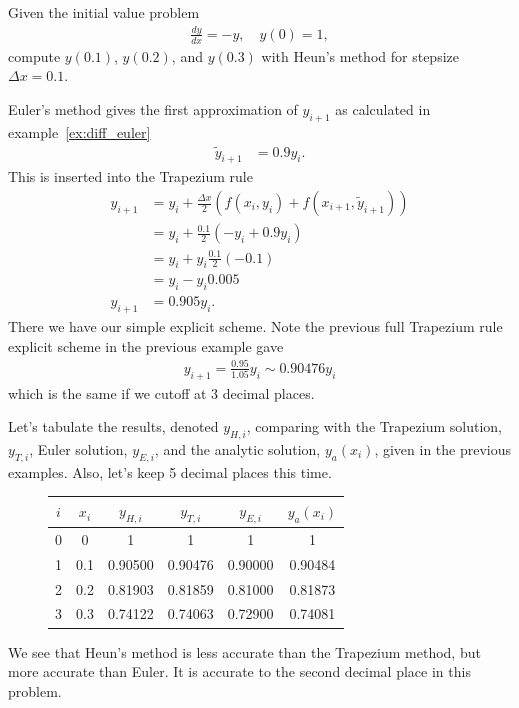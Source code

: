 \exemple{\upline}
{
Given the initial value problem
\begin{align*}
\frac{dy}{dx} = -y, \quad y(0)=1,
\end{align*}
compute $y(0.1)$, $y(0.2)$, and $y(0.3)$ with Heun's method for stepsize $\Delta x=0.1$.

\noindent Euler's method gives the first approximation of $y_{i+1}$ as calculated in example~\ref{ex:diff_euler}
\begin{align*}
\tilde{y}_{i+1} &= 0.9 y_i.
\end{align*}
This is inserted into the Trapezium rule
\begin{align*}
y_{i+1} &= y_i + \frac{\Delta x}{2} \left(f(x_i,y_i) + f(x_{i+1},\tilde{y}_{i+1}) \right) \\
%
&= y_i + \frac{0.1}{2} \left(-y_i + 0.9 y_i \right) \\
%
&= y_i + y_i  \frac{0.1}{2} \left(-0.1\right) \\
%
&= y_i - y_i 0.005 \\
%
y_{i+1}&= 0.905 y_i.
\end{align*}
There we have our simple explicit scheme. Note the previous full Trapezium rule explicit scheme in the previous example gave
\begin{align*}
y_{i+1} = \frac{0.95}{1.05} y_i \sim 0.90476 y_i
\end{align*}
which is the same if we cutoff at 3 decimal places.

Let's tabulate the results, denoted $y_{H,i}$, comparing with the Trapezium solution, $y_{T,i}$, Euler solution, $y_{E,i}$, and the analytic solution, $y_{a}(x_i)$, given in the previous examples. Also, let's keep 5 decimal places this time.
\begin{figure}[H]
\centering
\begin{tabular}{cccccc}
$i$ & $x_i$ & $y_{H,i}$ & $y_{T,i}$ & $y_{E,i}$ & $y_{a}(x_i)$ \\ \hline
0 & 0   & 1       & 1       & 1     & 1         \\
1 & 0.1 & 0.90500 & 0.90476 & 0.90000 & 0.90484 \\
2 & 0.2 & 0.81903 & 0.81859 & 0.81000 & 0.81873 \\
3 & 0.3 & 0.74122 & 0.74063 & 0.72900 & 0.74081
\end{tabular}
\end{figure}
We see that Heun's method is less accurate than the Trapezium method, but more accurate than Euler. It is accurate to the second decimal place in this problem.
}{\downline}

